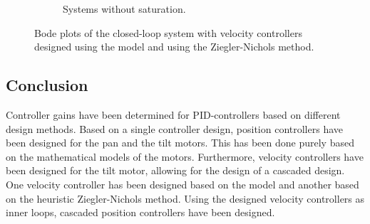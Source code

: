 \documentclass[../../main.tex]{subfiles}
\begin{document}
\begin{figure}[h]
\begin{subfigure}{0.48\textwidth}
    \caption{Systems without saturation.}
    \label{fig:cascade_step_NZ}
\end{subfigure}
\caption{Bode plots of the closed-loop system with velocity controllers designed using the model and using the Ziegler-Nichols method.}
\label{fig:cascade_step}
\end{figure}




\subsection{Conclusion}
Controller gains have been determined for PID-controllers based on different design methods. Based on a single controller design, position controllers have been designed for the pan and the tilt motors. This has been done purely based on the mathematical models of the motors. Furthermore, velocity controllers have been designed for the tilt motor, allowing for the design of a cascaded design. One velocity controller has been designed based on the model and another based on the heuristic Ziegler-Nichols method. Using the designed velocity controllers as inner loops, cascaded position controllers have been designed.
\end{document}

